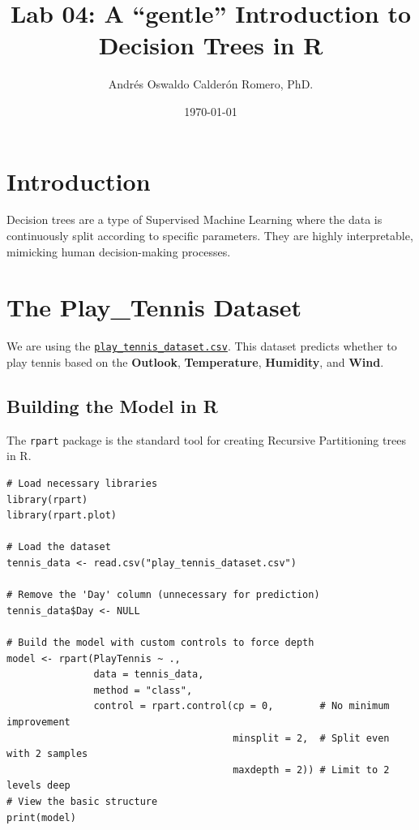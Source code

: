 \documentclass{article}
\title{Lab 04: A ``gentle'' Introduction to Decision Trees in R}
\author{Andrés Oswaldo Calderón Romero, PhD.}
\date{\today}
\begin{document}
\maketitle

\section{Introduction}
Decision trees are a type of Supervised Machine Learning where the data is continuously split according to specific parameters. They are highly interpretable, mimicking human decision-making processes.

\section{The Play\_Tennis Dataset}
We are using the \href{https://drive.google.com/file/d/1oxH5tVJkF2An3O5m80sbYNexTnE1xaeF/view?usp=sharing}{\texttt{play\_tennis\_dataset.csv}}. This dataset predicts whether to play tennis based on the \textbf{Outlook}, \textbf{Temperature}, \textbf{Humidity}, and \textbf{Wind}.

\subsection{Building the Model in R}
The \texttt{rpart} package is the standard tool for creating Recursive Partitioning trees in R.

\begin{listing}[H]
\begin{verbatim}
# Load necessary libraries
library(rpart)
library(rpart.plot)

# Load the dataset
tennis_data <- read.csv("play_tennis_dataset.csv")

# Remove the 'Day' column (unnecessary for prediction)
tennis_data$Day <- NULL

# Build the model with custom controls to force depth
model <- rpart(PlayTennis ~ .,
               data = tennis_data,
               method = "class",
               control = rpart.control(cp = 0,        # No minimum improvement
                                       minsplit = 2,  # Split even with 2 samples
                                       maxdepth = 2)) # Limit to 2 levels deep
# View the basic structure
print(model)
\end{verbatim}
\caption{Model construction using \texttt{rpart}.}
\end{listing}
\end{document}
